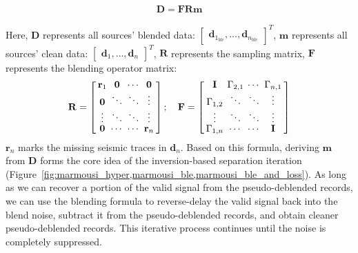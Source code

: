 \documentclass{segabs}
\begin{document}
\begin{equation}
\begin{array}{c}
\mathbf{D}=\mathbf{F} \mathbf{R}  \mathbf{m}
\label{eq:D=Tm_mx}
\end{array}
\end{equation}

Here, $\mathbf{D}$ represents all sources' blended data: 
$\left[
    \begin{array}{c}
        \mathbf{d}_{1_{ble}} ,
        \dots           ,
        \mathbf{d}_{n_{ble}}
    \end{array}\right]^{T}$, 
$\mathbf{m}$ represents all sources' clean data: $
\left[
    \begin{array}{c}
        \mathbf{d}_1 ,
        \dots        ,
        \mathbf{d}_n
    \end{array}
    \right]^{T}$, 
$\mathbf{R}$ represents the sampling matrix, $\mathbf{F}$ represents the blending operator matrix:
\begin{equation}
\renewcommand{\arraystretch}{0.8} %
\setlength{\arraycolsep}{2pt} %
\mathbf{R}=
\left[
    \begin{array}{cccc}
        \mathbf{r}_1         &\mathbf{0}  &\cdots      &\mathbf{0}      \\
        \mathbf{0}        &\ddots        &\ddots     &\vdots           \\
        \vdots             &\ddots       &\ddots      &\vdots           \\
        \mathbf{0}        &\cdots       &\cdots      &\mathbf{r}_n
    \end{array}\right] ;
    \quad
\mathbf{F}=
\left[
    \begin{array}{cccc}
        \mathbf{I}         &\Gamma_{2,1} &\cdots      &\Gamma_{n,1}     \\
        \Gamma_{1,2}       &\ddots        &\ddots     &\vdots           \\
        \vdots             &\ddots       &\ddots      &\vdots           \\
        \Gamma_{1,n}       &\cdots       &\cdots      &\mathbf{I}
    \end{array}\right] 
\end{equation}
$\mathbf{r}_n$ marks the missing seismic traces in $\mathbf{d}_n$.
Based on this formula, deriving $\mathbf{m}$ from $\mathbf{D}$ forms the core idea of the inversion-based separation iteration (Figure~\ref{fig:marmousi_hyper,marmousi_ble,marmousi_ble_and_loss}). As long as we can recover a portion of the valid signal from the pseudo-deblended \cite[]{mahdadSeparationBlendedData2011} records, we can use the blending formula to reverse-delay the valid signal back into the blend noise, subtract it from the pseudo-deblended records, and obtain cleaner pseudo-deblended records. This iterative process continues until the noise is completely suppressed.
\end{document}
